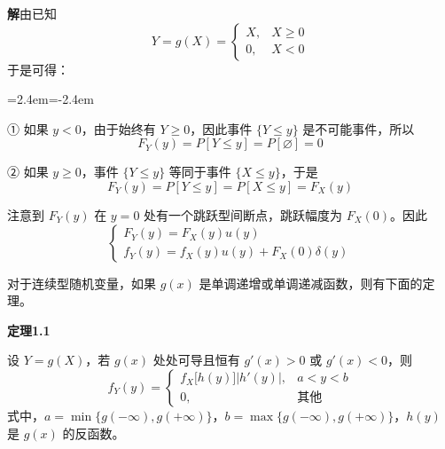 \documentclass[11pt,openany,UTF8]{ctexbook}
\newcommand{\bhead}[1]{\par\medskip\noindent\textbf{#1}\par\smallskip}
\newenvironment{citemize}
  {\begin{list}{}{\leftmargin=2.4em\itemindent=-2.4em\itemsep=1pt\topsep=3pt\parsep=0pt}}
  {\end{list}}
\begin{document}
\begin{examplebox}
\begin{center}
\begin{tikzpicture}[scale=0.9,every node/.style={font=\small}]
  \end{tikzpicture}

  \vspace{2pt}
  \label{fig:1.9}
\end{center}



\textbf{解}\quad 由已知
\[
Y=g(X)=\begin{cases}
X, & X\geqslant 0\\
0, & X<0
\end{cases}
\]
于是可得\nobreak：

\begin{citemize}
  \item ① 如果 $y<0$\nobreak，由于始终有 $Y\geqslant 0$\nobreak，因此事件 $\{Y\leqslant y\}$ 是不可能事件\nobreak，所以
  \[
  F_Y(y)=P[Y\leqslant y]=P[\varnothing]=0
  \]

  \item ② 如果 $y\geqslant 0$\nobreak，事件 $\{Y\leqslant y\}$ 等同于事件 $\{X\leqslant y\}$\nobreak，于是
  \[
  F_Y(y)=P[Y\leqslant y]=P[X\leqslant y]=F_X(y)
  \]
\end{citemize}

注意到 $F_Y(y)$ 在 $y=0$ 处有一个跳跃型间断点\nobreak，跳跃幅度为 $F_X(0)$\nobreak。因此
\begin{equation}
\begin{cases}
F_Y(y)=F_X(y)u(y)\\[2pt]
f_Y(y)=f_X(y)u(y)+F_X(0)\delta(y)
\end{cases}
\label{eq:1.27}
\end{equation}
\end{examplebox}

对于连续型随机变量\nobreak，如果 $g(x)$ 是单调递增或单调递减函数\nobreak，则有下面的定理\nobreak。

\bhead{定理1.1}\quad 设 $Y=g(X)$\nobreak，若 $g(x)$ 处处可导且恒有 $g'(x)>0$ 或 $g'(x)<0$\nobreak，则
\begin{equation}
f_Y(y)=\begin{cases}
f_X\bigl[h(y)\bigr]\bigl\lvert h'(y)\bigr\rvert, & a<y<b\\[2pt]
0, & \text{其他}
\end{cases}
\label{eq:1.28}
\end{equation}
式中\nobreak，$a=\min\bigl\{g(-\infty),g(+\infty)\bigr\}$\nobreak，$b=\max\bigl\{g(-\infty),g(+\infty)\bigr\}$\nobreak，$h(y)$ 是 $g(x)$ 的反函数\nobreak。
\end{document}
